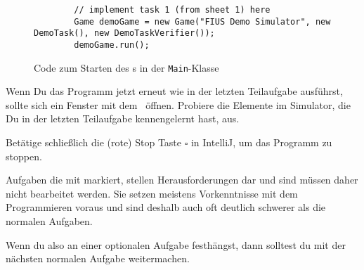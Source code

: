 \begin{enumerate}
    \begin{figure}
        \caption{Code zum Starten des \simulator s in der \texttt{Main}-Klasse}
        \label{s1c1:program-start-code}
        \begin{lstlisting}
        // implement task 1 (from sheet 1) here
        Game demoGame = new Game("FIUS Demo Simulator", new DemoTask(), new DemoTaskVerifier());
        demoGame.run();
        \end{lstlisting}
    \end{figure}

    Wenn Du das Programm jetzt erneut wie in der letzten Teilaufgabe ausführst, sollte sich ein Fenster mit dem \simulator~öffnen.
    Probiere die Elemente im Simulator, die Du in der letzten Teilaufgabe kennengelernt hast, aus.

    Betätige schließlich die (rote) Stop Taste $\square$ in IntelliJ, um das Programm zu stoppen.

\end{enumerate}

\begin{Infobox} %
    Aufgaben die mit \optional markiert, stellen Herausforderungen dar und sind müssen daher nicht bearbeitet werden.
    Sie setzen meistens Vorkenntnisse mit dem Programmieren voraus und sind deshalb auch oft deutlich schwerer als die normalen Aufgaben.

    Wenn du also an einer optionalen Aufgabe festhängst, dann solltest du mit der nächsten normalen Aufgabe weitermachen.
\end{Infobox}


